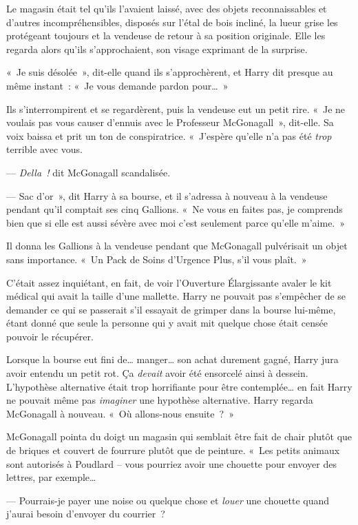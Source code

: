 \later

Le magasin était tel qu'ils l'avaient laissé, avec des objets reconnaissables et d'autres incompréhensibles, disposés sur l'étal de bois incliné, la lueur grise les protégeant toujours et la vendeuse de retour à sa position originale. Elle les regarda alors qu'ils s'approchaient, son visage exprimant de la surprise.

«~Je suis désolée~», dit-elle quand ils s'approchèrent, et Harry dit presque au même instant~: «~Je vous demande pardon pour…~»

Ils s'interrompirent et se regardèrent, puis la vendeuse eut un petit rire.
«~Je ne voulais pas vous causer d'ennuis avec le Professeur McGonagall~», dit-elle. Sa voix baissa et prit un ton de conspiratrice. «~J'espère qu'elle n'a pas été \emph{trop} terrible avec vous.

--- \emph{Della~!} dit McGonagall scandalisée.

--- Sac d'or~», dit Harry à sa bourse, et il s'adressa à nouveau à la vendeuse pendant qu'il comptait ses cinq Gallions. «~Ne vous en faites pas, je comprends bien que si elle est aussi sévère avec moi c'est seulement parce qu'elle m'aime.~»

Il donna les Gallions à la vendeuse pendant que McGonagall pulvérisait un objet sans importance. «~Un Pack de Soins d'Urgence Plus, s'il vous plaît.~»

C'était assez inquiétant, en fait, de voir l'Ouverture Élargissante avaler le kit médical qui avait la taille d'une mallette. Harry ne pouvait pas s'empêcher de se demander ce qui se passerait s'il essayait de grimper dans la bourse lui-même, étant donné que seule la personne qui y avait mit quelque chose était censée pouvoir le récupérer.

Lorsque la bourse eut fini de… manger… son achat durement gagné, Harry jura avoir entendu un petit rot. Ça \emph{devait} avoir été ensorcelé ainsi à dessein. L'hypothèse alternative était trop horrifiante pour être contemplée… en fait Harry ne pouvait même pas \emph{imaginer} une hypothèse alternative. Harry regarda McGonagall à nouveau. «~Où allons-nous ensuite~?~»

McGonagall pointa du doigt un magasin qui semblait être fait de chair plutôt que de briques et couvert de fourrure plutôt que de peinture.
«~Les petits animaux sont autorisés à Poudlard -- vous pourriez avoir une chouette pour envoyer des lettres, par exemple…

--- Pourrais-je payer une noise ou quelque chose et \emph{louer} une chouette quand j'aurai besoin d'envoyer du courrier~?

